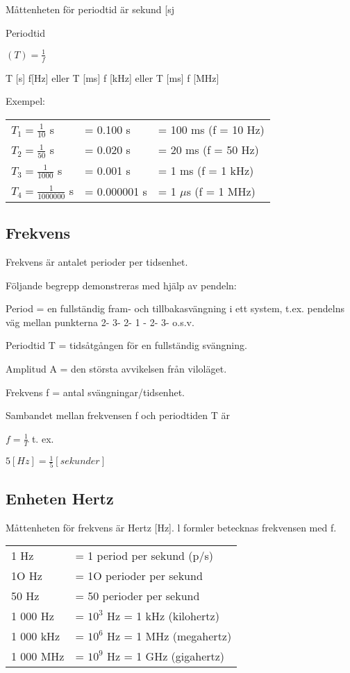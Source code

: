 \documentclass[a4paper,twoside,twocolumn,openright]{book}
\begin{document}
Måttenheten för periodtid är sekund [sj

Periodtid

$(T) = \frac{1}{f}$

T [s] f[Hz] eller
T [ms] f [kHz] eller
T [ms] f [MHz]

Exempel:

\begin{center}
\begin{tabular}{lll}
$T_1=\frac{1}{10}$ s & = 0.100 s & = 100 ms (f = 10 Hz)\\
$T_2=\frac{1}{50}$ s & = 0.020 s & = 20 ms (f = 50 Hz)\\
$T_3=\frac{1}{1000}$ s & = 0.001 s & = 1 ms (f = 1 kHz)\\
$T_4=\frac{1}{1000000}$ s & = 0.000001 s & = 1 $\mu$s (f = 1 MHz)\\
\end{tabular}
\end{center}

\subsection{Frekvens}

Frekvens är antalet perioder per tidsenhet.

Följande begrepp demonstreras med hjälp av pendeln:

Period = en fullständig fram- och tillbakasvängning i ett system, t.ex. pendelns väg
mellan punkterna 2- 3- 2- 1 - 2- 3- o.s.v.

Periodtid T = tidsåtgången för en fullständig svängning.

Amplitud A = den största avvikelsen från viloläget.

Frekvens f = antal svängningar/tidsenhet.

Sambandet mellan frekvensen f och periodtiden T är

$f=\frac{1}{T}$ t. ex.

$5 [H z] = \frac{1}{5} [sekunder]$

\subsection{Enheten Hertz}

Måttenheten för frekvens är Hertz [Hz].
l formler betecknas frekvensen med f.

\begin{center}
\begin{tabular}{ll}
1 Hz      & = 1 period per sekund (p/s) \\
1O Hz     & = 1O perioder per sekund \\
50 Hz     & = 50 perioder per sekund \\
1 000 Hz  & = $10^3$ Hz = 1 kHz (kilohertz) \\
1 000 kHz & = $10^6$ Hz = 1 MHz (megahertz) \\
1 000 MHz & = $10^9$ Hz = 1 GHz (gigahertz) \\
\end{tabular}
\end{center}
\end{document}
